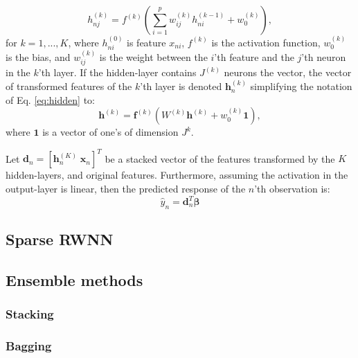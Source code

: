 \documentclass[
]{jss}
\begin{document}
\begin{equation}
h_{nj}^{(k)} = f^{(k)}\left(\sum_{i = 1}^p w^{(k)}_{ij} h_{ni}^{(k - 1)} + w^{(k)}_{0}\right), \label{eq:hidden}
\end{equation} for \(k = 1, ..., K\), where \(h_{ni}^{(0)}\) is feature
\(x_{ni}\), \(f^{(k)}\) is the activation function, \(w^{(k)}_0\) is the
bias, and \(w^{(k)}_{ij}\) is the weight between the \(i\)'th feature
and the \(j\)'th neuron in the \(k\)'th layer. If the hidden-layer
contains \(J^{(k)}\) neurons the vector, the vector of transformed
features of the \(k\)'th layer is denoted \(\boldsymbol h^{(k)}_{n}\)
simplifying the notation of Eq. \eqref{eq:hidden} to: \begin{equation}
\boldsymbol h^{(k)} = \boldsymbol f^{(k)}\left(W^{(k)} \boldsymbol{h}^{(k)} + w^{(k)}_0 \boldsymbol{1}\right),
\end{equation} where \(\boldsymbol{1}\) is a vector of one's of
dimension \(J^{k}\).

Let \(\boldsymbol d_n = [\boldsymbol h^{(K)}_n \; \boldsymbol x_n]^T\)
be a stacked vector of the features transformed by the \(K\)
hidden-layers, and original features. Furthermore, assuming the
activation in the output-layer is linear, then the predicted response of
the \(n\)'th observation is: \begin{equation}
\hat{y}_n = \boldsymbol d^T_n \boldsymbol \beta
\end{equation}

\hypertarget{sparse-rwnn}{%
\subsection{Sparse RWNN}\label{sparse-rwnn}}

\hypertarget{ensemble-methods}{%
\subsection{Ensemble methods}\label{ensemble-methods}}

\hypertarget{stacking}{%
\subsubsection{Stacking}\label{stacking}}

\hypertarget{bagging}{%
\subsubsection{Bagging}\label{bagging}}
\end{document}
